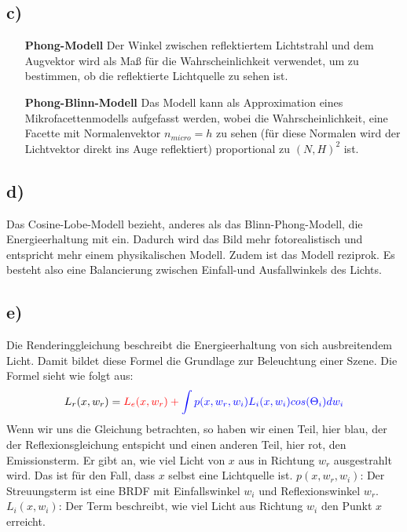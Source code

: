 \documentclass[10pt,a4paper]{article}
\begin{document}
\subsection*{c)}
\begin{itemize}
\item[\textbf{Phong-Modell}] Der Winkel zwischen reflektiertem Lichtstrahl und dem Augvektor wird als Maß für die Wahrscheinlichkeit verwendet, um zu bestimmen, ob die reflektierte Lichtquelle zu sehen ist.
\item[\textbf{Phong-Blinn-Modell}] Das Modell kann als Approximation eines Mikrofacettenmodells aufgefasst werden, wobei die Wahrscheinlichkeit, eine Facette mit Normalenvektor $n_{micro} = h$  zu sehen (für diese Normalen wird der Lichtvektor direkt ins Auge reflektiert) proportional zu $(N,H)^2$ ist.

\end{itemize}
\subsection*{d)}
Das Cosine-Lobe-Modell bezieht, anderes als das Blinn-Phong-Modell, die Energieerhaltung mit ein. Dadurch wird das Bild mehr fotorealistisch und entspricht mehr einem physikalischen Modell. Zudem ist das Modell reziprok. Es besteht also eine Balancierung zwischen Einfall-und Ausfallwinkels des Lichts.
\subsection*{e)}
Die Renderinggleichung beschreibt die Energieerhaltung von sich ausbreitendem Licht. 
Damit bildet diese Formel die Grundlage zur Beleuchtung einer Szene. Die Formel sieht wie folgt aus: $$L_r(x, w_r) = \color{red} L_e(x, w_r) +\color{blue} \int p(x, w_r, w_i)L_i(x, w_i)cos(\Theta_i)dw_i$$
Wenn wir uns die Gleichung betrachten, so haben wir einen Teil, hier blau, der der Reflexionsgleichung
entspicht und einen anderen Teil, hier rot, den Emissionsterm. Er gibt an, wie
viel Licht von $x$ aus in Richtung $w_r$ ausgestrahlt wird. Das ist für den Fall, dass $x$ selbst eine Lichtquelle ist.\newline
$p(x, w_r, w_i)$: Der Streuungsterm ist eine BRDF mit Einfallswinkel $w_i$ und Reflexionswinkel $w_r$.\newline
$L_i(x, w_i)$: Der Term beschreibt, wie viel Licht aus Richtung $w_i$ den Punkt $x$ erreicht.
\end{document}
